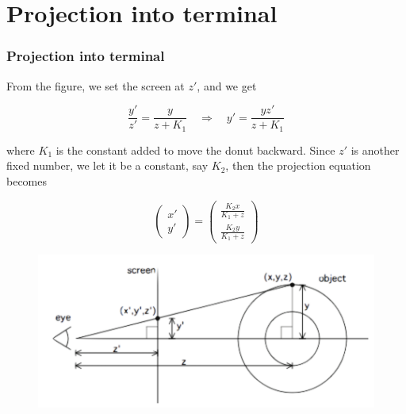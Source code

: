 \documentclass[12pt, t]{beamer}
\begin{document}

\section{Projection into terminal}
\begin{frame}
    \frametitle{Projection into terminal}

    From the figure, we set the screen at $z'$, and we get

    \begin{equation*}
        \frac{y'}{z'} = \frac{y}{z + K_1} \quad \Rightarrow \quad y' = \frac{yz'}{z + K_1}
    \end{equation*}

    where $K_1$ is the constant added to move the donut backward. Since $z'$ is another fixed number,
    we let it be a constant, say $K_2$, then the projection equation becomes

    \begin{equation*}
        \begin{pmatrix}
            x' \\[0.5em]
            y'
        \end{pmatrix}
        =
        \begin{pmatrix}
            \frac{K_2 x}{K_1 + z} \\[0.5em]
            \frac{K_2 y}{K_1 + z}
        \end{pmatrix}
    \end{equation*}

    \begin{figure}[H]
        \centering
        \includegraphics[width=0.5\linewidth]{Figures/projection.png}
        \label{fig1}
    \end{figure}

\end{frame}

\end{document}
